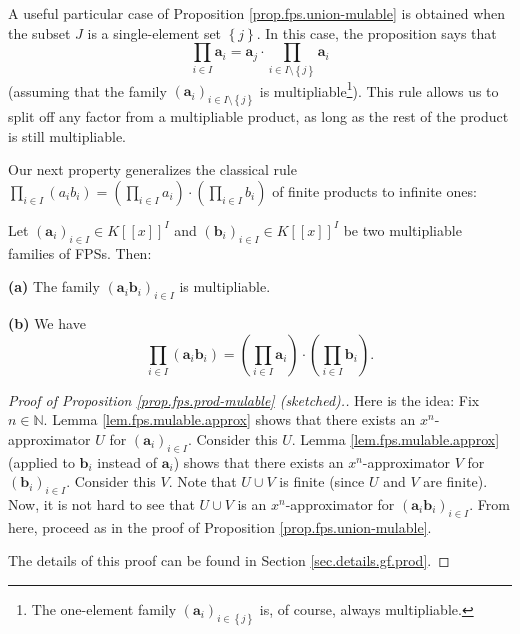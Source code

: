 A useful particular case of Proposition \ref{prop.fps.union-mulable} is
obtained when the subset $J$ is a single-element set $\left\{  j\right\}  $.
In this case, the proposition says that%
\[
\prod_{i\in I}\mathbf{a}_{i}=\mathbf{a}_{j}\cdot\prod_{i\in I\setminus\left\{
j\right\}  }\mathbf{a}_{i}%
\]
(assuming that the family $\left(  \mathbf{a}_{i}\right)  _{i\in
I\setminus\left\{  j\right\}  }$ is multipliable\footnote{The one-element
family $\left(  \mathbf{a}_{i}\right)  _{i\in\left\{  j\right\}  }$ is, of
course, always multipliable.}). This rule allows us to split off any factor
from a multipliable product, as long as the rest of the product is still
multipliable. \medskip

Our next property generalizes the classical rule $\prod_{i\in I}\left(
a_{i}b_{i}\right)  =\left(  \prod_{i\in I}a_{i}\right)  \cdot\left(
\prod_{i\in I}b_{i}\right)  $ of finite products to infinite ones:

\begin{proposition}
\label{prop.fps.prod-mulable}Let $\left(  \mathbf{a}_{i}\right)  _{i\in I}\in
K\left[  \left[  x\right]  \right]  ^{I}$ and $\left(  \mathbf{b}_{i}\right)
_{i\in I}\in K\left[  \left[  x\right]  \right]  ^{I}$ be two multipliable
families of FPSs. Then: \medskip

\textbf{(a)} The family $\left(  \mathbf{a}_{i}\mathbf{b}_{i}\right)  _{i\in
I}$ is multipliable. \medskip

\textbf{(b)} We have%
\[
\prod_{i\in I}\left(  \mathbf{a}_{i}\mathbf{b}_{i}\right)  =\left(
\prod_{i\in I}\mathbf{a}_{i}\right)  \cdot\left(  \prod_{i\in I}\mathbf{b}%
_{i}\right)  .
\]

\end{proposition}

\begin{proof}
[Proof of Proposition \ref{prop.fps.prod-mulable} (sketched).]Here is the
idea: Fix $n\in\mathbb{N}$. Lemma \ref{lem.fps.mulable.approx} shows that
there exists an $x^{n}$-approximator $U$ for $\left(  \mathbf{a}_{i}\right)
_{i\in I}$. Consider this $U$. Lemma \ref{lem.fps.mulable.approx} (applied to
$\mathbf{b}_{i}$ instead of $\mathbf{a}_{i}$) shows that there exists an
$x^{n}$-approximator $V$ for $\left(  \mathbf{b}_{i}\right)  _{i\in I}$.
Consider this $V$. Note that $U\cup V$ is finite (since $U$ and $V$ are
finite). Now, it is not hard to see that $U\cup V$ is an $x^{n}$-approximator
for $\left(  \mathbf{a}_{i}\mathbf{b}_{i}\right)  _{i\in I}$. From here,
proceed as in the proof of Proposition \ref{prop.fps.union-mulable}.

The details of this proof can be found in Section \ref{sec.details.gf.prod}.
\end{proof}

